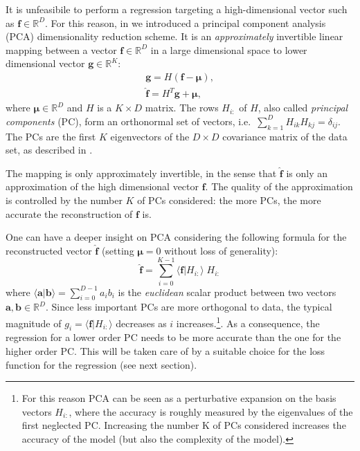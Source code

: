 \documentclass[twocolumn,showpacs,preprintnumbers,nofootinbib,prd,
superscriptaddress,10pt]{revtex4-1}
\newcommand{\R}{\mathbb{R}}
\begin{document}
It is unfeasibile to perform a regression targeting a high-dimensional vector such as $\boldsymbol{f} \in \R^D$. 
For this reason, in \cite{Schmidt:2020yuu} we introduced a principal component analysis (PCA) dimensionality 
reduction scheme.
It is an {\it approximately} invertible linear mapping between a vector $\boldsymbol{f} \in \R^D$ in a large dimensional space to lower dimensional vector  $\boldsymbol{g} \in \R^K$:
%
\begin{align}
	\mathbf{g} = H (\mathbf{f} - \boldsymbol{\mu}) \label{eq:PCA_reduction_model},\\
	\hat{\mathbf{f}} = H^T \mathbf{g} + \boldsymbol{\mu}, \label{eq:PCA_reconstruction_model}
\end{align}
where $\boldsymbol{\mu} \in \R^D$ and $H$ is a $K \times D$ matrix.
The rows $H_{i:}$ of $H$, also called {\it principal components} (PC), form an orthonormal set of vectors, 
i.e.~${\sum_{k=1}^D H_{ik} H_{kj} = \delta_{ij}}$.
The PCs are the first $K$ eigenvectors of the $D \times D$ covariance matrix of the data set, as described in 
\cite[Sec. 12]{murphy2012machine}.

The mapping is only approximately invertible, in the sense that $\hat{\mathbf{f}}$ is only an approximation of the high dimensional vector $\mathbf{f}$. The quality of the approximation is controlled by the number $K$ of PCs considered: the more PCs, the more accurate the reconstruction of $\mathbf{f}$ is.

One can have a deeper insight on PCA considering the following formula for the reconstructed vector $\hat{\mathbf{f}}$ (setting $\boldsymbol{\mu}=0$ without loss of generality):
\begin{equation} \label{eq:perturbative_exp}
	\hat{\mathbf{f}} = \sum_{i=0}^{K-1} \langle \mathbf{f} | H_{i:} \rangle \; H_{i:}
\end{equation}
%
where $\langle \mathbf{a} | \mathbf{b} \rangle = \sum_{i=0}^{D-1} a_i b_i$ is the {\it euclidean} scalar product between two vectors $\mathbf{a}, \mathbf{b} \in \R^D$.
%
Since less important PCs are more orthogonal to data, the typical magnitude of $g_i = \langle \mathbf{f} | H_{i:} \rangle$ decreases as $i$ increases.\footnote{For this reason PCA can be seen as a perturbative expansion on the basis vectors $H_{i:}$, where the accuracy is roughly measured by the eigenvalues of the first neglected PC. Increasing the number K of PCs considered increases the accuracy of the model (but also the complexity of the model).}.
As a consequence, the regression for a lower order PC needs to be more accurate than the one for the higher order PC. This will be taken care of by a suitable choice for the loss function for the regression (see next section).
\end{document}
